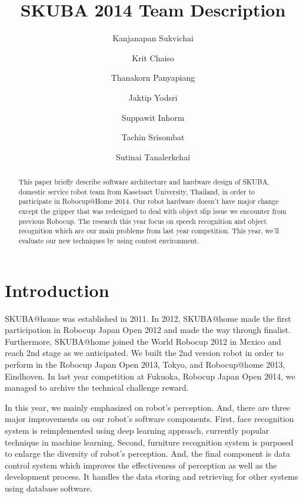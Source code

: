 \documentclass{llncs}
\begin{document}
\title{SKUBA 2014 Team Description}
\author{Kanjanapan Sukvichai
\and Krit Chaiso
\and Thanakorn Panyapiang
\and Jaktip Yodsri
\and Suppawit Inhorm
\and Tachin Srisombat
\and Sutinai Tanalerkchai
}


\maketitle

\begin{abstract}
This paper briefly describe software architecture and hardware design of SKUBA, domestic service robot team from Kasetsart University, Thailand, in order to participate in Robocup@Home 2014. Our robot hardware doesn't have major change except the gripper that was redesigned to deal with object slip issue we encounter from previous Robocup. The research this year focus on speech recognition and object recognition which are our main problems from last year competition. This year, we'll evaluate our new techniques by using contest environment.
\end{abstract}

\section{Introduction}

SKUBA@home was established in 2011. In 2012, SKUBA@home made the first participation in Robocup Japan Open 2012 and made the way through finalist. Furthermore, SKUBA@home joined the World Robocup 2012 in Mexico and reach 2nd stage as we anticipated. We built the 2nd version robot in order to perform in the Robocup Japan Open 2013, Tokyo, and Robocup@home 2013, Eindhoven. In last year competition at Fukuoka, Robocup Japan Open 2014, we managed to archive the technical challenge reward.

In this year, we mainly emphasized on robot's perception. And, there are three major improvements on our robot's software components. First, face recognition system is reimplemented using deep learning approach, currently popular technique in machine learning. Second, furniture recognition system is purposed to enlarge the diversity of robot's perception. And, the final component is data control system which improves the effectiveness of perception as well as the development process. It handles the data storing and retrieving for other systems using database software.
\end{document}
